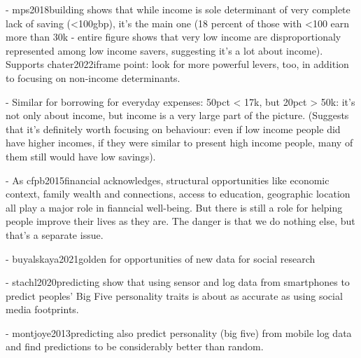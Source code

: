
- mps2018building shows that while income is sole determinant of very complete
lack of saving (<100gbp), it's the main one (18 percent of those with <100 earn
more than 30k - entire figure shows that very low income are disproportionaly
represented among low income savers, suggesting it's a lot about income).
Supports chater2022iframe point: look for more powerful levers, too, in
addition to focusing on non-income determinants.

- Similar for borrowing for everyday expenses: 50pct < 17k, but 20pct > 50k:
it's not only about income, but income is a very large part of the picture.
(Suggests that it's definitely worth focusing on behaviour: even if low income
people did have higher incomes, if they were similar to present high income
people, many of them still would have low savings).

- As cfpb2015financial acknowledges, structural opportunities like economic
context, family wealth and connections, access to education, geographic
location all play a major role in fianncial well-being. But there is still a
role for helping people improve their lives as they are. The danger is that we
do nothing else, but that's a separate issue. 




- buyalskaya2021golden for opportunities of new data for social research

- stachl2020predicting show that using sensor and log data from smartphones to
predict peoples' Big Five personality traits is about as accurate as using
social media footprints.

- montjoye2013predicting also predict personality (big five) from mobile log
data and find predictions to be considerably better than random.




